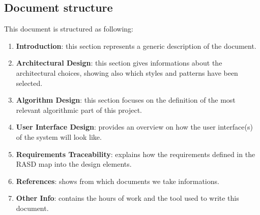 \subsection{Document structure}
This document is structured as following:
\begin{enumerate}
	\item \textbf{Introduction}: this section represents a generic description of the document.
	\item \textbf{Architectural Design}: this section gives informations about the architectural choices, showing also which styles and patterns have been selected.
	\item \textbf{Algorithm Design}: this section focuses on the definition of the most relevant
	algorithmic part of this project.
	\item \textbf{User Interface Design}: provides an overview on how the user interface(s) of the system will look like.
	\item \textbf{Requirements Traceability}: explains how the requirements defined in the RASD map	into the design elements.
	\item \textbf{References}: shows from which documents we take informations.
	\item \textbf{Other Info}: contains the hours of work and the tool used to write this document.
\end{enumerate}